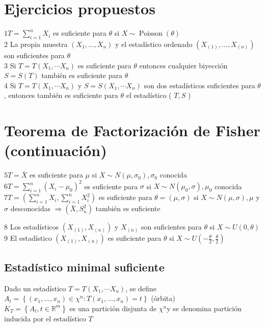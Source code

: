 \section*{Ejercicios propuestos}
$1 T=\sum_{i=1}^{n} X_{i}$ es suficiente para $\theta$ si $X \sim \operatorname{Poisson}(\theta)$\\
2 La propia muestra $\left(X_{1}, \ldots, X_{n}\right)$ y el estadístico ordenado $\left(X_{(1)}, \ldots, X_{(n)}\right)$ son suficientes para $\theta$\\
3 Si $T=T\left(X_{1}, \cdots X_{n}\right)$ es suficiente para $\theta$ entonces cualquier biyección $S=S(T)$ también es suficiente para $\theta$\\
4 Si $T=T\left(X_{1}, \cdots X_{n}\right)$ y $S=S\left(X_{1}, \cdots X_{n}\right)$ son dos estadísticos suficientes para $\theta$, entonces también es suficiente para $\theta$ el estadístico ( $T, S$ )

\section*{Teorema de Factorización de Fisher (continuación)}
$5 T=\bar{X}$ es suficiente para $\mu$ si $X \sim N\left(\mu, \sigma_{0}\right), \sigma_{0}$ conocida\\
$6 T=\sum_{i=1}^{n}\left(X_{i}-\mu_{0}\right)^{2}$ es suficiente para $\sigma$ si $X \sim N\left(\mu_{0}, \sigma\right), \mu_{0}$ conocida\\
$7 T=\left(\sum_{i=1}^{n} X_{i}, \sum_{i=1}^{n} X_{i}^{2}\right)$ es suficiente para $\theta=(\mu, \sigma)$ si $X \sim N(\mu, \sigma), \mu$ y $\sigma$ desconocidas $\Rightarrow\left(\bar{X}, S_{n}^{2}\right)$ también es suficiente

8 Los estadísticos $\left(X_{(1)}, X_{(n)}\right)$ y $X_{(n)}$ son suficientes para $\theta$ si $X \sim U(0, \theta)$\\
9 El estadístico $\left(X_{(1)}, X_{(n)}\right)$ es suficiente para $\theta$ si $X \sim U\left(-\frac{\theta}{2}, \frac{\theta}{2}\right)$

\subsection*{Estadístico minimal suficiente}

Dado un estadístico $T=T\left(X_{1}, \cdots X_{n}\right)$, se define $A_{t}=\left\{\left(x_{1}, \ldots, x_{n}\right) \in \chi^{n}: T\left(x_{1}, \ldots, x_{n}\right)=t\right\}$ (órbita)\\
$K_{T}=\left\{A_{t}, t \in \mathbb{R}^{m}\right\}$ es una partición disjunta de $\chi^{n} \mathrm{y}$ se denomina partición inducida por el estadístico $T$


